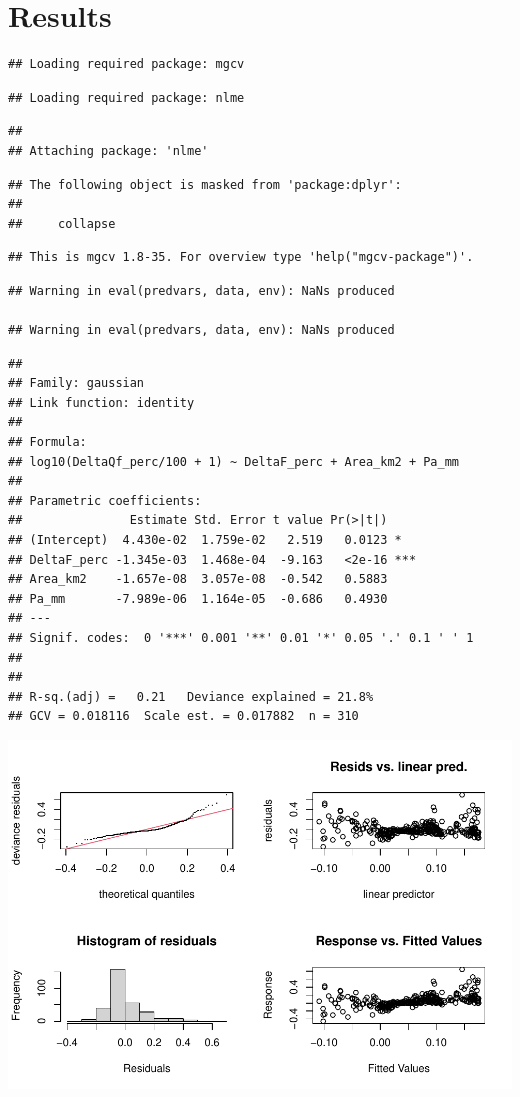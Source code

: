 \documentclass[]{elsarticle} %
\begin{document}
\hypertarget{results}{%
\section{Results}\label{results}}

\begin{verbatim}
## Loading required package: mgcv
\end{verbatim}

\begin{verbatim}
## Loading required package: nlme
\end{verbatim}

\begin{verbatim}
## 
## Attaching package: 'nlme'
\end{verbatim}

\begin{verbatim}
## The following object is masked from 'package:dplyr':
## 
##     collapse
\end{verbatim}

\begin{verbatim}
## This is mgcv 1.8-35. For overview type 'help("mgcv-package")'.
\end{verbatim}

\begin{verbatim}
## Warning in eval(predvars, data, env): NaNs produced

## Warning in eval(predvars, data, env): NaNs produced
\end{verbatim}

\begin{verbatim}
## 
## Family: gaussian 
## Link function: identity 
## 
## Formula:
## log10(DeltaQf_perc/100 + 1) ~ DeltaF_perc + Area_km2 + Pa_mm
## 
## Parametric coefficients:
##               Estimate Std. Error t value Pr(>|t|)    
## (Intercept)  4.430e-02  1.759e-02   2.519   0.0123 *  
## DeltaF_perc -1.345e-03  1.468e-04  -9.163   <2e-16 ***
## Area_km2    -1.657e-08  3.057e-08  -0.542   0.5883    
## Pa_mm       -7.989e-06  1.164e-05  -0.686   0.4930    
## ---
## Signif. codes:  0 '***' 0.001 '**' 0.01 '*' 0.05 '.' 0.1 ' ' 1
## 
## 
## R-sq.(adj) =   0.21   Deviance explained = 21.8%
## GCV = 0.018116  Scale est. = 0.017882  n = 310
\end{verbatim}

\includegraphics{Forest_and_Water_files/figure-latex/model2-1.pdf}
\end{document}
